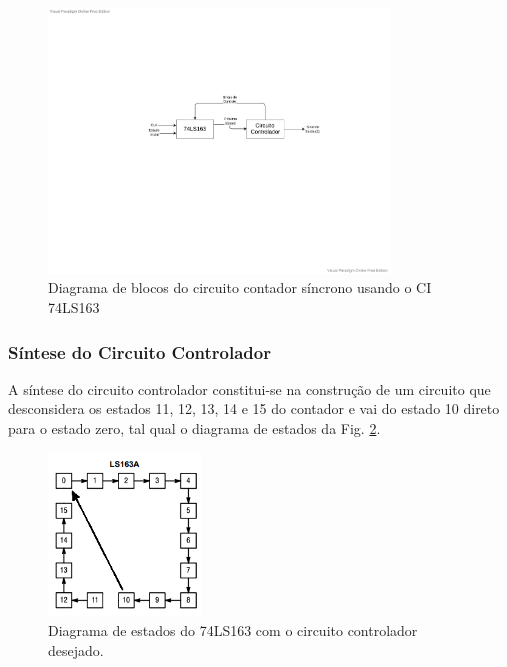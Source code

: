 \documentclass[a4,12pt]{horizon-theme}
\begin{document}
\begin{figure}[!ht]
  \centering
  \includegraphics[width=0.81\textwidth, trim={75mm 90mm 55mm 60mm}, clip]{diagrama_blocos_74163.pdf}
  \caption{Diagrama de blocos do circuito contador síncrono usando o CI 74LS163}
  \label{fig:diagrama_blocos_74163}
\end{figure}

\subsubsection{Síntese do Circuito Controlador}
\label{sec:plan_74163_uc}

A síntese do circuito controlador constitui-se na construção de um circuito que desconsidera os estados 11, 12, 13, 14 e 15 do contador e vai do estado 10 direto para o estado zero, tal qual o diagrama de estados da Fig. \ref{fig:diagrama_estados_74163}.

\newpage
\begin{figure}[!ht]
  \centering
  \includegraphics[width=0.36\textwidth]{diagrama_estados_74163.png}
  \caption{Diagrama de estados do 74LS163 com o circuito controlador desejado.}
  \label{fig:diagrama_estados_74163}
\end{figure}
\end{document}
